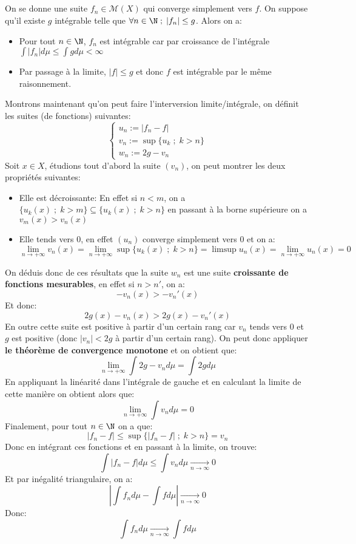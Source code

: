 \documentclass{report}
\begin{document}
   \subsection*{}
   On se donne une suite \(f_n \in \mathscr{M}(X)\) qui converge simplement vers \(f\). On suppose qu'il existe \(g\) intégrable telle que \(\forall n \in \N \; ; \; |f_n| \leq g\). Alors on a:
   \begin{itemize}
      \item Pour tout \(n\in \N\), \(f_n\) est intégrable car par croissance de l'intégrale \(\int |f_n| d\mu \leq \int g d\mu < \infty\)
      \item Par passage à la limite, \(|f| \leq g\) et donc \(f\) est intégrable par le même raisonnement.
   \end{itemize}
   Montrons maintenant qu'on peut faire l'interversion limite/intégrale, on définit les suites (de fonctions) suivantes:
   \[
      \begin{cases}
         u_n := |f_n - f|\\
         v_n := \sup\{u_k \; ; \; k > n\}\\
         w_n := 2g - v_n
      \end{cases}
   \]
   Soit \(x \in X\), étudions tout d'abord la suite \((v_n)\), on peut montrer les deux propriétés suivantes:
   \begin{itemize}
   \item Elle est décroissante:
   En effet si \(n < m\), on a \(\{u_k(x) \; ; \; k > m\} \subseteq \{u_k(x) \; ; \; k > n\}\) en passant à la borne supérieure on a \(v_m(x) > v_n(x)\)
   \item Elle tends vers 0, en effet \((u_n)\) converge simplement vers 0 et on a:
   \[
      \lim_{n \rightarrow +\infty} v_n(x) =  \lim_{n \rightarrow +\infty} \sup\{u_k(x) \; ; \; k > n\} = \limsup u_n(x) = \lim_{n \rightarrow +\infty} u_n(x) = 0
   \]
   \end{itemize}
   On déduis donc de ces résultats que la suite \(w_n\) est une suite \textbf{croissante de fonctions mesurables}, en effet si \(n > n'\), on a:
   \[
      -v_n(x) > -v_n'(x) 
   \]
   Et donc:
   \[
      2g(x) - v_n(x) > 2g(x) -v_n'(x) 
   \]
   En outre cette suite est positive à partir d'un certain rang car \(v_n\) tends vers 0 et \(g\) est positive (donc \(|v_n| < 2g\) à partir d'un certain rang). On peut donc appliquer \textbf{le théorème de convergence monotone} et on obtient que:
   \[
      \lim_{n \rightarrow +\infty} \int 2g - v_n d\mu = \int 2g d\mu
   \]
   En appliquant la linéarité dans l'intégrale de gauche et en calculant la limite de cette manière on obtient alors que:
   \[
      \lim_{n \rightarrow +\infty} \int v_n d\mu = 0
   \]
   Finalement, pour tout \(n \in \N\) on a que:
   \[
      |f_n - f| \leq \sup\{|f_n - f| \; ; \; k > n\} = v_n
   \]
   Donc en intégrant ces fonctions et en passant à la limite, on trouve:
   \[
      \int |f_n - f| d\mu \leq \int v_n d\mu \underset{n \rightarrow \infty}{\longrightarrow} 0
   \]
   Et par inégalité triangulaire, on a: 
   \[
      \left|\int f_n d\mu - \int f d\mu  \right| \underset{n \rightarrow \infty}{\longrightarrow} 0
   \]
   Donc:
   \[
      \int f_n d\mu \underset{n \rightarrow \infty}{\longrightarrow} \int f d\mu
   \]
\end{document}
